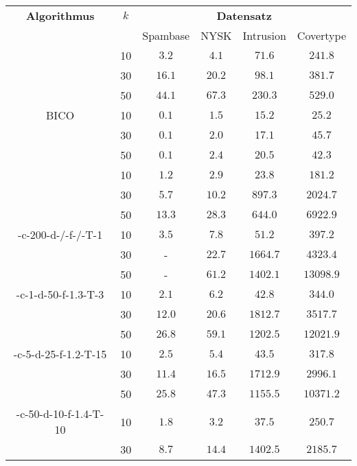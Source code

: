 \begin{table}[h]
\centering
\begin{tabular}{@{}cccccc@{}} \toprule
	\textbf{Algorithmus} & $k$ & \multicolumn{4}{c}{\textbf{Datensatz}} \\
	\cmidrule(r){3-6} & 		& Spambase 				& NYSK 				& Intrusion 			& Covertype \\ \toprule
	\Skmpp 						& 10 & $3.2$ 			& $4.1$ 			& $71.6$ 				& $241.8$ \\
		 						& 30 & $16.1$ 			& $20.2$ 			& $98.1$ 				& $381.7$ \\
		 						& 50 & $44.1$ 			& $67.3$ 			& $230.3$ 				& $529.0$ \\
	\midrule
	BICO 						& 10 & $0.1$ 			& $1.5$ 			& $15.2$ 				& $25.2$ \\
			 					& 30 & $0.1$ 			& $2.0$ 			& $17.1$ 				& $45.7$ \\
		 						& 50 & $0.1$ 			& $2.4$ 			& $20.5$ 				& $42.3$ \\
	\midrule
	\kmpp 						& 10 & $1.2$ 			& $2.9$ 			& $23.8$ 				& $181.2$ \\
			 					& 30 & $5.7$ 			& $10.2$ 			& $897.3$ 				& $2024.7$ \\
		 						& 50 & $13.3$ 			& $28.3$ 			& $644.0$ 				& $6922.9$ \\
	\midrule
	\KCsTwo-c-200-d-/-f-/-T-1	& 10 & $3.5$			& $7.8$				& $51.2$ 				& $397.2$ \\
			 					& 30 & - 				& $22.7$			& $1664.7$ 				& $4323.4$ \\
		 						& 50 & - 				& $61.2$			& $1402.1$ 				& $13098.9$ \\
	\midrule
	\KCsTwo-c-1-d-50-f-1.3-T-3	& 10 & $2.1$ 			& $6.2$ 			& $42.8$ 				& $344.0$ \\
			 					& 30 & $12.0$ 			& $20.6$ 			& $1812.7$ 				& $3517.7$ \\
		 						& 50 & $26.8$ 			& $59.1$ 			& $1202.5$ 				& $12021.9$ \\
	\midrule
	\KCsTwo-c-5-d-25-f-1.2-T-15	& 10 & $2.5$ 			& $5.4$ 			& $43.5$ 				& $317.8$ \\
			 					& 30 & $11.4$ 			& $16.5$ 			& $1712.9$ 				& $2996.1$ \\
		 						& 50 & $25.8$ 			& $47.3$ 			& $1155.5$ 				& $10371.2$ \\
	\midrule
	\KCsTwo-c-50-d-10-f-1.4-T-10& 10 & $1.8$ 			& $3.2$ 			& $37.5$ 				& $250.7$ \\
			 					& 30 & $8.7$ 			& $14.4$ 			& $1402.5$ 				& $2185.7$ \\

\end{tabular}
\end{table}

